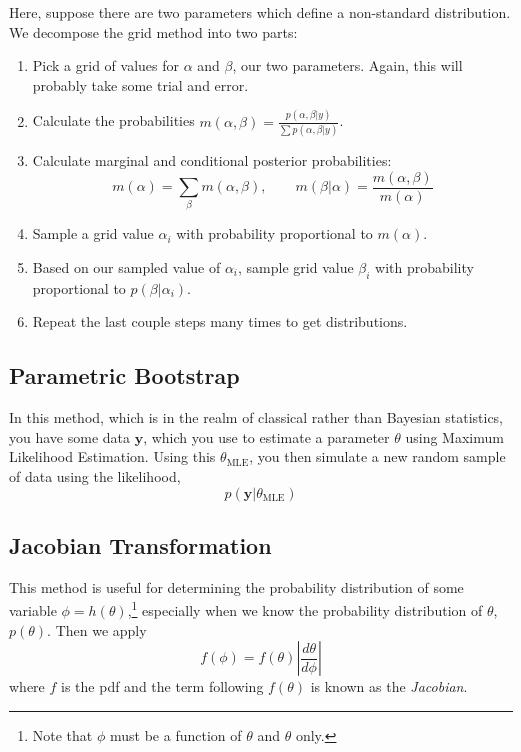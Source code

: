 \documentclass[12pt]{article}
\theoremstyle{plain}
\theoremstyle{definition}
\theoremstyle{remark}
\begin{document}
Here, suppose there are two parameters which define a non-standard
distribution. We decompose the grid method into two parts:
\begin{enumerate}
   \item Pick a grid of values for $\alpha$ and $\beta$, our two
      parameters. Again, this will probably take some trial and
      error.
   \item Calculate the probabilities $m(\alpha, \beta) = \frac{
      p(\alpha, \beta |y)}{\sum p(\alpha, \beta | y)}$.
   \item Calculate marginal and conditional posterior probabilities:
      \[ m(\alpha) = \sum_\beta m(\alpha, \beta), \qquad
	 m(\beta|\alpha) = \frac{m(\alpha, \beta)}{m(\alpha)}\]
   \item Sample a grid value $\alpha_i$ with probability proportional
      to $m(\alpha)$.
   \item Based on our sampled value of $\alpha_i$, sample grid value
      $\beta_i$ with probability proportional to $p(\beta | \alpha_i)$.
   \item Repeat the last couple steps many times to get distributions.
\end{enumerate}



\newpage
\subsection{Parametric Bootstrap}

In this method, which is in the realm of classical rather than Bayesian
statistics, you have some data $\mathbf{y}$, which you use to estimate
a parameter $\theta$ using Maximum Likelihood Estimation. Using
this $\theta_{\text{MLE}}$, you then simulate a new random sample of
data using the likelihood,
\[ p(\mathbf{y} | \theta_{\text{MLE}}) \]

\subsection{Jacobian Transformation}

This method is useful for determining the probability distribution
of some variable $\phi = h(\theta)$,\footnote{Note that $\phi$ must be a
function of $\theta$ and $\theta$ only.} especially
when we know the probability distribution
of $\theta$, $p(\theta)$.  Then we apply
   \[ f(\phi) = f(\theta) \left\lvert
      \frac{d\theta}{d\phi} \right\rvert \]
where $f$ is the pdf and the term following $f(\theta)$ is known as
the \emph{Jacobian}.
\end{document}
